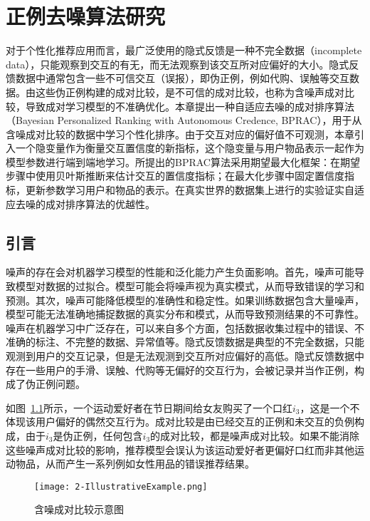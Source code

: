 

\chapter{正例去噪算法研究}
\label{cha:2}
对于个性化推荐应用而言，最广泛使用的隐式反馈是一种不完全数据（incomplete data），只能观察到交互的有无，而无法观察到该交互所对应偏好的大小。隐式反馈数据中通常包含一些不可信交互（误报），即伪正例，例如代购、误触等交互数据。由这些伪正例构建的成对比较，是不可信的成对比较，也称为含噪声成对比较，导致成对学习模型的不准确优化。本章提出一种自适应去噪的成对排序算法（Bayesian Personalized Ranking with Autonomous Credence, BPRAC），用于从含噪成对比较的数据中学习个性化排序。由于交互对应的偏好值不可观测，本章引入一个隐变量作为衡量交互置信度的新指标，这个隐变量与用户物品表示一起作为模型参数进行端到端地学习。所提出的BPRAC算法采用期望最大化框架：在期望步骤中使用贝叶斯推断来估计交互的置信度指标；在最大化步骤中固定置信度指标，更新参数学习用户和物品的表示。在真实世界的数据集上进行的实验证实自适应去噪的成对排序算法的优越性。

\section{引言}
噪声的存在会对机器学习模型的性能和泛化能力产生负面影响。首先，噪声可能导致模型对数据的过拟合。模型可能会将噪声视为真实模式，从而导致错误的学习和预测。其次，噪声可能降低模型的准确性和稳定性。如果训练数据包含大量噪声，模型可能无法准确地捕捉数据的真实分布和模式，从而导致预测结果的不可靠性。噪声在机器学习中广泛存在，可以来自多个方面，包括数据收集过程中的错误、不准确的标注、不完整的数据、异常值等。隐式反馈数据是典型的不完全数据，只能观测到用户的交互记录，但是无法观测到交互所对应偏好的高低。隐式反馈数据中存在一些用户的手滑、误触、代购等无偏好的交互行为，会被记录并当作正例，构成了伪正例问题。

如图~\ref{Fig2-1}所示，一个运动爱好者在节日期间给女友购买了一个口红$i_3$，这是一个不体现该用户偏好的偶然交互行为。成对比较是由已经交互的正例和未交互的负例构成，由于$i_3$是伪正例，任何包含$i_3$的成对比较，都是噪声成对比较。如果不能消除这些噪声成对比较的影响，推荐模型会误认为该运动爱好者更偏好口红而非其他运动物品，从而产生一系列例如女性用品的错误推荐结果。
\begin{figure}[!htbp]
	\centering
	\texttt{[image: 2-IllustrativeExample.png]}
	\caption{含噪成对比较示意图}
	\label{Fig2-1}
\end{figure}

